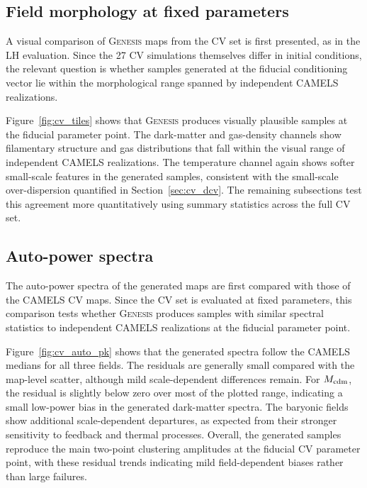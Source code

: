 \documentclass{article}
\newcommand{\Mcdm}{M_{\rm cdm}}
\begin{document}
\subsection{Field morphology at fixed parameters}
\label{sec:cv_tiles}

A visual comparison of \textsc{Genesis} maps from the CV set is first
presented, as in the LH evaluation. Since the 27 CV simulations
themselves differ in initial conditions, the relevant question is
whether samples generated at the fiducial conditioning vector lie
within the morphological range spanned by independent CAMELS
realizations.

Figure~\ref{fig:cv_tiles} shows that \textsc{Genesis} produces
visually plausible samples at the fiducial parameter point. The
dark-matter and gas-density channels show filamentary structure and
gas distributions that fall within the visual range of independent
CAMELS realizations. The temperature channel again shows softer
small-scale features in the generated samples, consistent with the
small-scale over-dispersion quantified in Section~\ref{sec:cv_dcv}.
The remaining subsections test this agreement more quantitatively
using summary statistics across the full CV set.

\subsection{Auto-power spectra}
\label{sec:cv_auto_pk}

The auto-power spectra of the generated maps are first compared with
those of the CAMELS CV maps. Since the CV set is evaluated at fixed
parameters, this comparison tests whether \textsc{Genesis} produces
samples with similar spectral statistics to independent CAMELS
realizations at the fiducial parameter point.

Figure~\ref{fig:cv_auto_pk} shows that the generated spectra follow
the CAMELS medians for all three fields. The residuals are generally
small compared with the map-level scatter, although mild
scale-dependent differences remain. For $\Mcdm$, the residual is
slightly below zero over most of the plotted range, indicating a small
low-power bias in the generated dark-matter spectra. The baryonic
fields show additional scale-dependent departures, as expected from
their stronger sensitivity to feedback and thermal processes.
Overall, the generated samples reproduce the main two-point
clustering amplitudes at the fiducial CV parameter point, with these
residual trends indicating mild field-dependent biases rather than
large failures.
\end{document}
